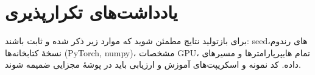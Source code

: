 \section*{یادداشت‌های تکرارپذیری}
برای بازتولید نتایج مطمئن شوید که موارد زیر ذکر شده و ثابت باشند: seedهای رندوم، نسخهٔ کتابخانه‌ها (PyTorch, numpy)، مشخصات GPU، تمام هایپرپارامترها و مسیرهای داده. کد نمونه و اسکریپت‌های آموزش و ارزیابی باید در پوشهٔ مجزایی ضمیمه شوند.



